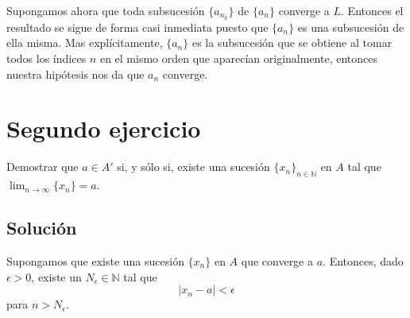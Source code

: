 \documentclass[fleqn,leqno,11pt,letterpaper,final]{article}
\begin{document}
Supongamos ahora que toda subsucesión $\{ a_{n_k} \}$ de $\{ a_n \}$ converge a $L$.
Entonces el resultado se sigue de forma casi inmediata puesto que $\{ a_n \}$ es una
subsucesión de ella misma. Mas explícitamente, $\{ a_n \}$ es la subsucesión que se obtiene
al tomar todos los índices $n$ en el mismo orden que aparecían originalmente, entonces
nuestra hipótesis nos da que $a_n$ converge.

\section{Segundo ejercicio}%
\label{sec:Segundo ejercicio}
Demostrar que $a\in A'$ si, y sólo si, existe una sucesión $\{ x_n \}_{n\in\mathbb{N}}$ en $A$ tal que
$ \lim_{n \to \infty} \{ x_n \}=a$.

\subsection{Solución}
Supongamos que existe una sucesión $\{ x_n \}$ en $A$ que converge a $a$.
Entonces, dado $\epsilon>0$, existe un $N_\epsilon\in\mathbb{N}$ tal que
\[
	\left\lvert x_{n}-a \right\rvert<\epsilon
\]
para $n>N_\epsilon$.
\end{document}
